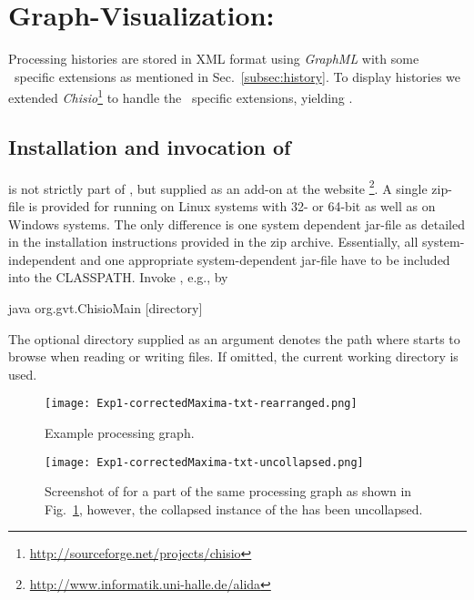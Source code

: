 \section{Graph-Visualization: \mtbc}
\label{app:chipory}

Processing histories are stored in XML format using {\em GraphML} with some
\alida\ specific extensions as mentioned in Sec.~\ref{subsec:history}.
To display histories we extended
{\em Chisio}\footnote{\href{http://sourceforge.net/projects/chisio}
{http://sourceforge.net/projects/chisio}} to handle the \alida\ specific
extensions, yielding \mtbc.

\subsection{Installation and invocation of \mtbc}

\mtbc is not strictly part of \alida, but supplied as an add-on
at the \alida website%
\footnote{\href{http://www.informatik.uni-halle.de/alida}{http://www.informatik.uni-halle.de/alida}}.
A single zip-file is provided for running \mtbc on Linux systems with 32- or
64-bit as well as on Windows systems. The only difference is one system
dependent jar-file as detailed in the installation instructions provided in the zip archive.
Essentially, all system-independent and one appropriate system-dependent
jar-file have to be included into the CLASSPATH.
Invoke \mtbc, e.g., by
\vspace*{0.5cm}
\begin{code}
  java org.gvt.ChisioMain [directory]
\end{code}

\vspace*{-0.25cm}
The optional directory supplied as an argument denotes the path where
\mtbc starts to browse when reading or writing files.
If omitted, the current working directory is used.

\begin{figure}[ht]
\centerline{{\texttt{[image: Exp1-correctedMaxima-txt-rearranged.png]}}}
\caption[Example of a processing graph.]{\label{fig:DAG-repeat}
Example processing graph.
}
\end{figure}

\begin{figure}
\begin{center}
{\texttt{[image: Exp1-correctedMaxima-txt-uncollapsed.png]}}
\caption{\label{fig:exa}Screenshot of \mtbc for a part of the same processing graph as shown in
Fig.~\ref{fig:DAG-repeat}, however, the collapsed instance of the
 has been uncollapsed.}
\end{center}
\end{figure}


